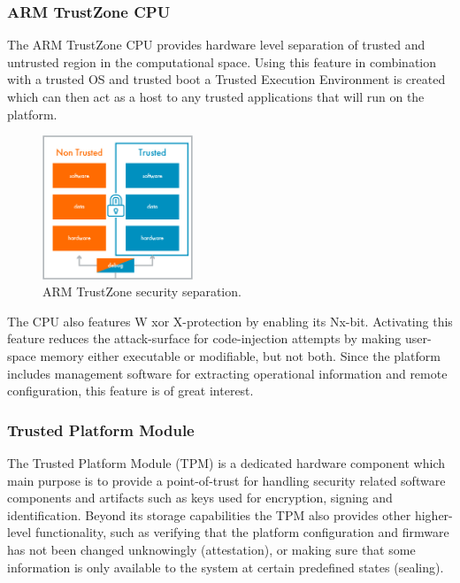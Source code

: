 \documentclass[10pt]{article}
\begin{document}
      \subsubsection{ARM TrustZone CPU}

        The ARM TrustZone CPU provides hardware level separation of trusted and
        untrusted region in the computational space. Using this feature in
        combination with a trusted OS and trusted boot a Trusted Execution
        Environment is created which can then act as a host to any trusted
        applications that will run on the platform.

        \begin{figure}[!h]
          \center
          \includegraphics[width=0.4\textwidth]{input/arm_trust.jpg}
          \caption{ARM TrustZone security separation.}
        \end{figure}

        The CPU also features W xor X-protection by enabling its Nx-bit.
        Activating this feature reduces the attack-surface for code-injection
        attempts by making user-space memory either executable or modifiable,
        but not both. Since the platform includes management software for
        extracting operational information and remote configuration, this
        feature is of great interest.

      \subsubsection{Trusted Platform Module}

        The Trusted Platform Module (TPM) is a dedicated hardware component
        which main purpose is to provide a point-of-trust for handling security
        related software components and artifacts such as keys used for
        encryption, signing and identification. Beyond its storage
        capabilities the TPM also provides other higher-level functionality,
        such as verifying that the platform configuration and firmware has not
        been changed unknowingly (attestation), or making sure that some information
        is only available to the system at certain predefined states (sealing).
\end{document}
